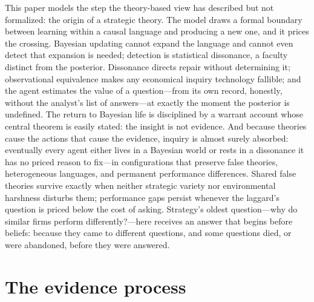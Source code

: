 \documentclass[11pt]{article}
\theoremstyle{definition}
\begin{document}
This paper models the step the theory-based view has described but not formalized: the origin of a strategic theory.
The model draws a formal boundary between learning within a causal language and producing a new one, and it prices the crossing.
Bayesian updating cannot expand the language and cannot even detect that expansion is needed; detection is statistical dissonance, a faculty distinct from the posterior.
Dissonance directs repair without determining it; observational equivalence makes any economical inquiry technology fallible; and the agent estimates the value of a question---from its own record, honestly, without the analyst's list of answers---at exactly the moment the posterior is undefined.
The return to Bayesian life is disciplined by a warrant account whose central theorem is easily stated: the insight is not evidence.
And because theories cause the actions that cause the evidence, inquiry is almost surely absorbed: eventually every agent either lives in a Bayesian world or rests in a dissonance it has no priced reason to fix---in configurations that preserve false theories, heterogeneous languages, and permanent performance differences.
Shared false theories survive exactly when neither strategic variety nor environmental harshness disturbs them; performance gaps persist whenever the laggard's question is priced below the cost of asking.
Strategy's oldest question---why do similar firms perform differently?---here receives an answer that begins before beliefs: because they came to different questions, and some questions died, or were abandoned, before they were answered.




\appendix
\section{The evidence process}
\label{app:eprocess}
\end{document}
